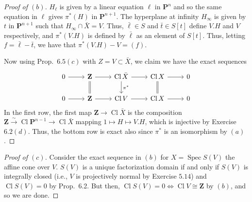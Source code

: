 \documentclass[10pt]{article}
\theoremstyle{definition}
\theoremstyle{remark}
\numberwithin{equation}{section}
\numberwithin{figure}{subsubsection}
\DeclareMathOperator{\Spec}{Spec}
\DeclareMathOperator{\Cl}{Cl}
\newcommand{\isoto}{\overset{\sim}{\to}}
\begin{document}
\begin{proof}[Proof of $(b)$]
  $H_\ell$ is given by a linear equation $\ell$ in $\mathbf{P}^n$ and so the same equation in $\ell$ gives $\pi^*(H)$ in $\mathbf{P}^{n+1}$. The hyperplane at infinity $H_\infty$ is given by $t$ in $\mathbf{P}^{n+1}$ such that $H_\infty \cap \bar{X} = V$. Thus, $\bar{\ell} \in S$ and $\bar{t} \in S[t]$ define $V.H$ and $V$ respectively, and $\pi^*(V.H)$ is defined by $\bar{\ell}$ as an element of $S[t]$. Thus, letting $f = \bar{\ell} - \bar{t}$, we have that $\pi^*(V.H) - V = (f)$.
  \par Now using Prop.~$6.5(c)$ with $Z = V \subset \bar{X}$, we claim we have the exact sequences
  \begin{equation*}
    \begin{tikzcd}
      0 \rar & \mathbf{Z} \rar\dar[equal] & \Cl \bar{X} \rar\dar{\pi^*} & \Cl X \rar\dar[equal] & 0\\
      0 \rar & \mathbf{Z} \rar & \Cl V \rar & \Cl X \rar & 0
    \end{tikzcd}
  \end{equation*}
  In the first row, the first map $\mathbf{Z} \to \Cl \bar{X}$ is the composition $\mathbf{Z} \isoto \Cl \mathbf{P}^{n-1} \to \Cl \bar{X}$ mapping $1 \mapsto H \mapsto V.H$, which is injective by Exercise $6.2(d)$. Thus, the bottom row is exact also since $\pi^*$ is an isomorphism by $(a)$.
\end{proof}
\begin{proof}[Proof of $(c)$]
  Consider the exact sequence in $(b)$ for $X = \Spec S(V)$ the affine cone over $V$. $S(V)$ is a unique factorization domain if and only if $S(V)$ is integrally closed (i.e., $V$ is projectively normal by Exercise $5.14$) and $\Cl S(V) = 0$ by Prop.~6.2. But then, $\Cl S(V) = 0 \iff \Cl V \cong \mathbf{Z}$ by $(b)$, and so we are done.
\end{proof}
\end{document}
